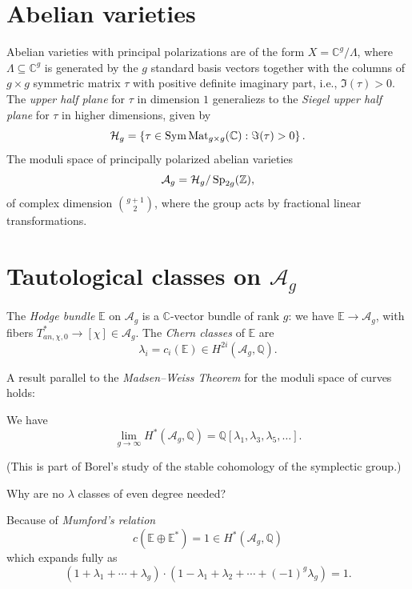 \documentclass[reqno]{amsart} 
\begin{document}
\section{Abelian varieties}
Abelian varieties with principal polarizations are of the form $X = \mathbb{C}^g  / \Lambda$, where $\Lambda \subseteq \mathbb{C}^g$ is generated by the $g$ standard basis vectors together with the columns of $g \times g$ symmetric matrix $\tau$ with positive definite imaginary part, i.e., $\Im(\tau) > 0$.  The \emph{upper half plane} for $\tau$ in dimension $1$ generaliezs to the \emph{Siegel upper half plane} for $\tau$ in higher dimensions, given by
\begin{equation*}
  \mathcal{H}_g = \left\{ \tau \in \operatorname{Sym} \operatorname{Mat}_{g \times g}(\mathbb{C}) : \Im(\tau) > 0 \right\}.
\end{equation*}
The moduli space of principally polarized abelian varieties
\begin{equation*}
  \mathcal{A}_g = \mathcal{H}_g / \operatorname{Sp}_{2 g}(\mathbb{Z}),
\end{equation*}
of complex dimension $\binom{g + 1}{2}$, where the group acts by fractional linear transformations.

\section{Tautological classes on $\mathcal{A}_g$}

The \emph{Hodge bundle} $\mathbb{E}$ on $\mathcal{A}_g$ is a $\mathbb{C}$-vector bundle of rank $g$: we have $\mathbb{E} \rightarrow \mathcal{A}_g$, with fibers $T^\ast_{an, \chi, 0} \rightarrow[\chi] \in \mathcal{A}_g$.  The \emph{Chern classes} of $\mathbb{E}$ are
\begin{equation*}
  \lambda_i = c_i(\mathbb{E}) \in H^{2 i}( \mathcal{A}_g, \mathbb{Q} ).
\end{equation*}

A result parallel to the \emph{Madsen--Weiss Theorem} for the moduli space of curves holds:
\begin{theorem}[Borel 1974]
  We have
  \begin{equation*}
    \lim_{g \rightarrow \infty} H^\ast(\mathcal{A}_g, \mathbb{Q}) = \mathbb{Q}[\lambda_1, \lambda_3, \lambda_5, \dotsc].
  \end{equation*}
\end{theorem}
(This is part of Borel's study of the stable cohomology of the symplectic group.)

\begin{question}
  Why are no $\lambda$ classes of even degree needed?
\end{question}
\begin{answer}
  Because of \emph{Mumford's relation}
  \begin{equation*}
    c(\mathbb{E} \oplus \mathbb{E}^\ast) = 1 \in H^\ast(\mathcal{A}_g , \mathbb{Q})
  \end{equation*}
  which expands fully as
  \begin{equation*}
    (1 + \lambda_1 + \dotsb + \lambda_g) \cdot(1 - \lambda_1 + \lambda_2 + \dotsb +(- 1)^g \lambda_g) = 1.
  \end{equation*}
\end{answer}
\end{document}
